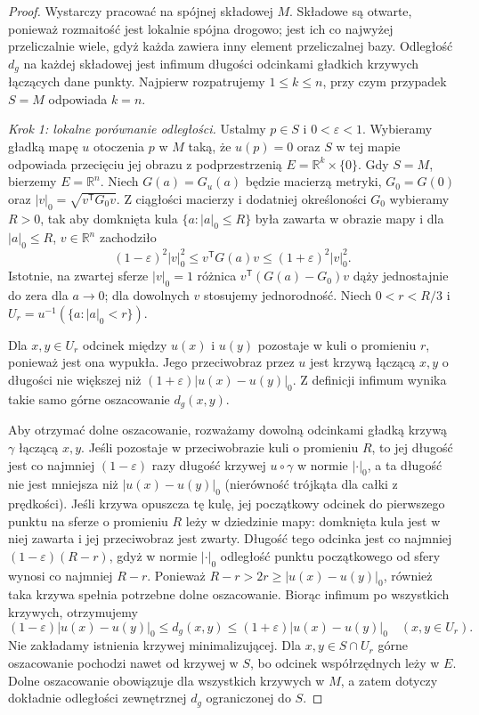 \begin{proof}
Wystarczy pracować na spójnej składowej $M$.
Składowe są otwarte, ponieważ rozmaitość jest
lokalnie spójna drogowo; jest ich co najwyżej
przeliczalnie wiele, gdyż każda zawiera inny element
przeliczalnej bazy. Odległość $d_g$ na każdej
składowej jest infimum długości odcinkami gładkich
krzywych łączących dane punkty.
Najpierw rozpatrujemy $1\le k\le n$, przy czym
przypadek $S=M$ odpowiada $k=n$.

\emph{Krok 1: lokalne porównanie odległości.}
Ustalmy $p\in S$ i $0<\varepsilon<1$. Wybieramy gładką
mapę $u$ otoczenia $p$ w $M$ taką, że $u(p)=0$
oraz $S$ w tej mapie odpowiada przecięciu jej obrazu
z podprzestrzenią $E=\mathbb R^k\times\{0\}$.
Gdy $S=M$, bierzemy $E=\mathbb R^n$.
Niech $G(a)=G_u(a)$ będzie macierzą metryki,
$G_0=G(0)$ oraz $|v|_0=\sqrt{v^{\mathsf T}G_0v}$.
Z ciągłości macierzy i dodatniej określoności $G_0$
wybieramy $R>0$, tak aby domknięta kula
$\{a:|a|_0\le R\}$ była zawarta w obrazie mapy
i dla $|a|_0\le R$, $v\in\mathbb R^n$ zachodziło
\[
 (1-\varepsilon)^2|v|_0^2
 \le v^{\mathsf T}G(a)v
 \le(1+\varepsilon)^2|v|_0^2.
\]
Istotnie, na zwartej sferze $|v|_0=1$ różnica
$v^{\mathsf T}(G(a)-G_0)v$ dąży jednostajnie do zera
dla $a\to0$; dla dowolnych $v$ stosujemy jednorodność.
Niech $0<r<R/3$ i $U_r=u^{-1}(\{a:|a|_0<r\})$.

Dla $x,y\in U_r$ odcinek między $u(x)$ i $u(y)$
pozostaje w kuli o promieniu $r$, ponieważ jest ona
wypukła. Jego przeciwobraz przez $u$ jest krzywą
łączącą $x,y$ o długości nie większej niż
$(1+\varepsilon)|u(x)-u(y)|_0$.
Z definicji infimum wynika takie samo górne
oszacowanie $d_g(x,y)$.

Aby otrzymać dolne oszacowanie, rozważamy dowolną
odcinkami gładką krzywą $\gamma$ łączącą $x,y$.
Jeśli pozostaje w przeciwobrazie kuli o promieniu
$R$, to jej długość jest co najmniej
$(1-\varepsilon)$ razy długość krzywej $u\circ\gamma$
w normie $|\cdot|_0$, a ta długość nie jest mniejsza
niż $|u(x)-u(y)|_0$ (nierówność trójkąta dla
całki z prędkości). Jeśli krzywa opuszcza tę kulę,
jej początkowy odcinek do pierwszego punktu na
sferze o promieniu $R$ leży w dziedzinie mapy:
domknięta kula jest w niej zawarta i jej przeciwobraz
jest zwarty. Długość tego odcinka jest co najmniej
$(1-\varepsilon)(R-r)$, gdyż w normie $|\cdot|_0$
odległość punktu początkowego od sfery wynosi
co najmniej $R-r$. Ponieważ $R-r>2r\ge|u(x)-u(y)|_0$,
również taka krzywa spełnia potrzebne dolne
oszacowanie. Biorąc infimum po wszystkich krzywych,
otrzymujemy
\[
 (1-\varepsilon)|u(x)-u(y)|_0
 \le d_g(x,y)
 \le(1+\varepsilon)|u(x)-u(y)|_0
 \quad(x,y\in U_r).
\]
Nie zakładamy istnienia krzywej minimalizującej.
Dla $x,y\in S\cap U_r$ górne oszacowanie pochodzi
nawet od krzywej w $S$, bo odcinek współrzędnych
leży w $E$. Dolne oszacowanie obowiązuje dla wszystkich
krzywych w $M$, a zatem dotyczy dokładnie odległości
zewnętrznej $d_g$ ograniczonej do $S$.


\end{proof}
